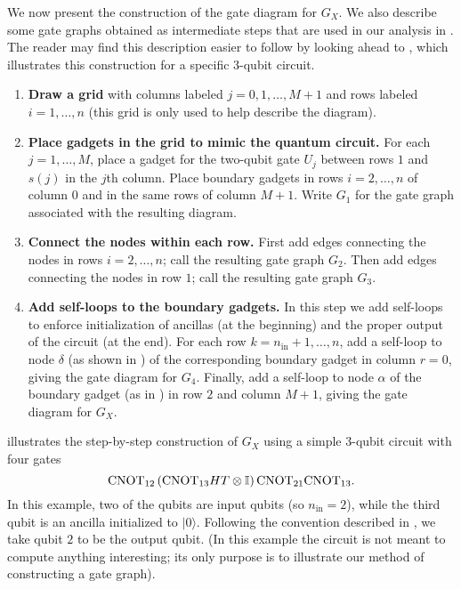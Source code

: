 \documentclass[../thesis-main/thesis-main]{subfiles}
\begin{document}
We now present the construction of the gate diagram for $G_X$.  We also describe some gate graphs obtained as intermediate steps that are used in our analysis in . The reader may find this description easier to follow by looking ahead to , which illustrates this construction for a specific $3$-qubit circuit.

\begin{enumerate}
\item \textbf{Draw a grid} with columns labeled $j=0,1,\ldots,M+1$ and rows labeled $i=1,\ldots,n$ (this grid is only used to help describe the diagram).
\item \textbf{Place gadgets in the grid to mimic the quantum circuit.}
For each $j=1,\ldots,M$, place a gadget for the two-qubit gate $U_j$ between rows $1$ and $s(j)$ in the $j$th column. Place boundary gadgets in rows $i=2,\ldots,n$ of column $0$ and in the same rows of column $M+1$. Write $G_{1}$ for the gate graph associated with the resulting diagram.
\item \textbf{Connect the nodes within each row.}
First add edges connecting the nodes in rows $i=2,\ldots,n$; call the resulting gate graph $G_{2}$. Then add edges connecting the nodes in row $1$; call the resulting gate graph $G_{3}$.
\item \textbf{Add self-loops to the boundary gadgets.}
In this step we add self-loops to enforce initialization of ancillas (at the beginning) and the proper output of the circuit (at the end). For each row $k=n_{\text{in}}+1,\ldots,n$, add a self-loop to node $\delta$ (as shown in  ) of the corresponding boundary gadget in column $r=0$, giving the gate diagram for $G_{4}$. Finally, add a self-loop to node $\alpha$ of the boundary gadget (as in ) in row %
$2$ and column $M+1$, giving the gate diagram for $G_X$.
\end{enumerate}

 illustrates the step-by-step construction of $G_X$ using a simple $3$-qubit circuit with four gates 
\[
\mathrm{CNOT}_{12}\left(\mathrm{CNOT}_{13}HT\otimes\mathbb{I}\right)\mathrm{CNOT}_{21}\mathrm{CNOT}_{13}.
\]
In this example, two of the qubits are input qubits (so $n_{\text{in}}=2$), while the third qubit is an ancilla 
initialized to $|0\rangle$.
Following the convention described in , we take qubit $2$ to be the output qubit. (In this example the circuit is not meant to compute anything interesting; its only purpose is to illustrate our method of constructing a gate graph).
\end{document}
